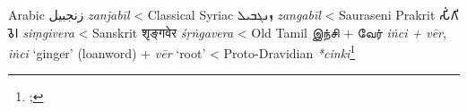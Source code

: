 \begin{etymology}\label{ety:zanjabil}
Arabic {زنجبيل} \textit{zanjabīl}
< Classical Syriac {ܙܢܓܒܝܠ‎} \textit{zangabīl}
< Sauraseni Prakrit {𑀲𑀺𑀁𑀕𑀺𑀯𑁂𑀭} \textit{siṃgivera}
< Sanskrit {शृङ्गवेर} \textit{śṛṅgavera}
< Old Tamil {இந்சி + வேர்} \textit{iṅci + vēr}, \textit{iṅci} `ginger' (loanword) + \textit{vēr} `root'
< Proto-Dravidian \textit{*cinki}\footnote{; }
\end{etymology}